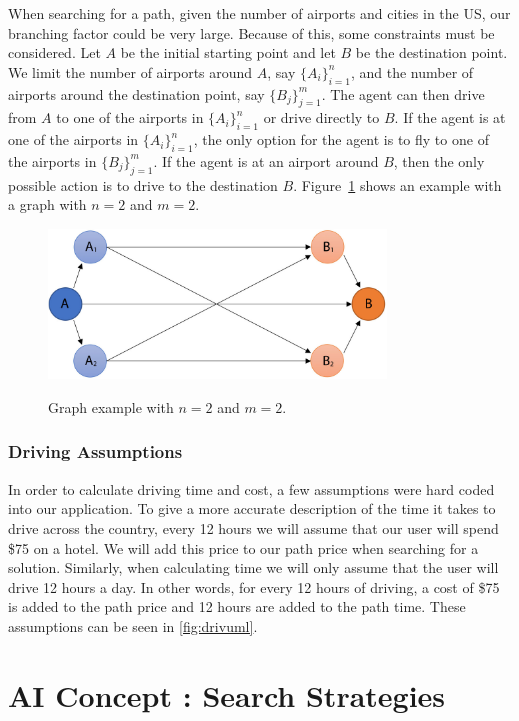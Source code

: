 \documentclass[11pt]{article}
\begin{document}
When searching for a path, given the number of airports and cities in the US, our branching factor could be very large. Because of this, some constraints must be considered. Let $A$ be the initial starting point and let $B$ be the destination point. We limit the number of airports around $A$, say $\{ A_i \}_{i=1}^n$, and the number of airports around the destination point, say $\{ B_j \}_{j=1}^m$. The agent can then drive from $A$ to one of the airports in $\{ A_i \}_{i=1}^n$ or drive directly to $B$. If the agent is at one of the airports in $\{ A_i \}_{i=1}^n$, the only option for the agent is to fly to one of the airports in $\{ B_j \}_{j=1}^m$. If the agent is at an airport around $B$, then the only possible action is to drive to the destination $B$. Figure~\ref{fig:graph_example} shows an example with a graph with $n = 2$ and $m = 2$.
\begin{figure}[!ht]
  \caption{Graph example with $n=2$ and $m=2$.}
  \centering
  \includegraphics[width=0.8\textwidth]{Graph_example_n2}
  \label{fig:graph_example}
\end{figure}

\subsubsection{Driving Assumptions}

In order to calculate driving time and cost, a few assumptions were hard coded into our application. To give a more accurate description of the time it takes to drive across the country, every 12 hours we will assume that our user will spend \$75 on a hotel. We will add this price to our path price when searching for a solution. Similarly, when calculating time we will only assume that the user will drive 12 hours a day. In other words, for every 12 hours of driving, a cost of \$75 is added to the path price and 12 hours are added to the path time. These assumptions can be seen in \ref{fig:drivuml}.



\section{AI Concept : Search Strategies}\label{sec:search}
\end{document}
